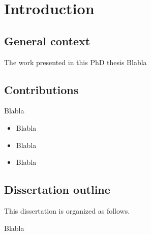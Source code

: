 
\chapter*{Introduction}
\minitoc
\label{chapter:Intro}
\graphicspath{{2-Chapters/1-Chapter/Images/}}


\section*{General context}

\indent
The work presented in this PhD thesis
Blabla

\section*{Contributions}

Blabla

\begin{itemize}
\item Blabla
\item Blabla
\item Blabla
\end{itemize}

\section*{Dissertation outline}
This dissertation is organized as follows.

Blabla